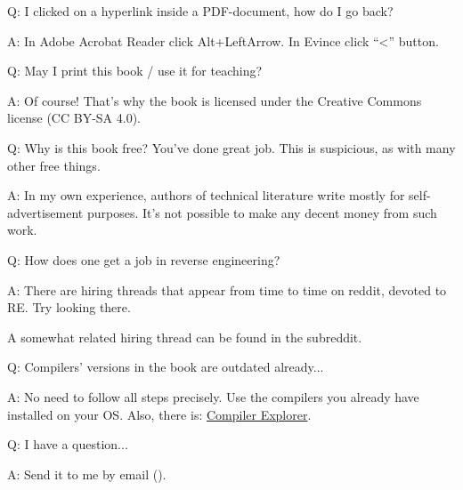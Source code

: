 \par Q: I clicked on a hyperlink inside a PDF-document, how do I go back?
\par A: In Adobe Acrobat Reader click Alt+LeftArrow. In Evince click ``<'' button.

\par Q: May I print this book / use it for teaching?
\par A: Of course! That's why the book is licensed under the Creative Commons license (CC BY-SA 4.0).

\par Q: Why is this book free? You've done great job. This is suspicious, as with many other free things.
\par A: In my own experience, authors of technical literature write mostly for self-advertisement purposes.
It's not possible to make any decent money from such work.

\par Q: How does one get a job in reverse engineering?
\par A: There are hiring threads that appear from time to time on reddit, devoted to RE\FNURLREDDIT{}.
Try looking there.

A somewhat related hiring thread can be found in the  subreddit.

\par Q: Compilers' versions in the book are outdated already...
\par A: No need to follow all steps precisely.
Use the compilers you already have installed on your \ac{OS}.
Also, there is: \href{https://godbolt.org/}{Compiler Explorer}.

\par Q: I have a question...
\par A: Send it to me by email (\EMAIL).
